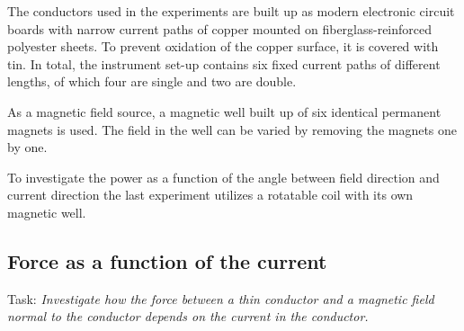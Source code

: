 \documentclass[../Elmag-labhefte-2020.tex]{subfiles}
\begin{document}

The conductors used in the experiments are built up as modern electronic circuit boards with narrow current paths of copper mounted on fiberglass-reinforced polyester sheets. To prevent oxidation of the copper surface, it is covered with tin. In total, the instrument set-up contains six fixed current paths of different lengths, of which four are single and two are double.

As a magnetic field source, a magnetic well built up of six identical permanent magnets is used. The field in the well can be varied by removing the magnets one by one.

To investigate the power as a function of the angle between field direction and current direction the last experiment utilizes a rotatable coil with its own magnetic well.



\subsection{Force as a function of the current}

Task:
\emph{Investigate how the force between a thin conductor and a magnetic field normal to the conductor depends on the current in the conductor.}
\end{document}
